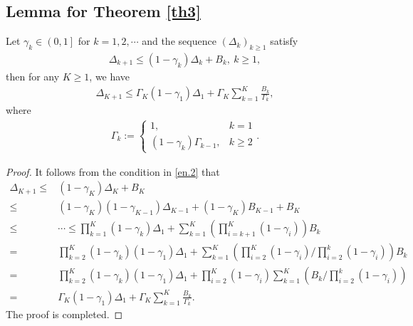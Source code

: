 \documentclass[twoside,11pt]{article}
\begin{document}
\subsection{Lemma for Theorem \ref{th3}}
\begin{lemma}\label{Lemre}
Let $\gamma_k\in\left( 0,1 \right]$ for $k=1,2,\cdots$ and the sequence $\left(  \Delta_k\right)_{k\ge 1}$ satisfy
\begin{equation}\label{en.2}
   	\begin{aligned}
   	\Delta_{k+1}\le (1-\gamma_k)\Delta_{k}+B_k,\ k\ge 1,
   	\end{aligned}
\end{equation}
then for any $K\ge 1$, we have 
\begin{equation}\label{Lemre.1}
   	\begin{aligned}
   	\Delta_{K+1}\le \Gamma_K(1-\gamma_1)\Delta_1+\Gamma_K\sum_{k=1}^{K}\frac{B_k}{\Gamma_k},
   	\end{aligned}
\end{equation}
where
\begin{equation}
   	\begin{aligned}
   	\Gamma_k:=
   	\begin{cases}
   	1,& \text{$k=1$}\\
   	(1-\gamma_k)\Gamma_{k-1},& \text{$k\ge2$}
   	\end{cases}.\nonumber
   	\end{aligned}
\end{equation}
\end{lemma}
\begin{proof}
It follows from the condition in \eqref{en.2} that
\begin{equation}
   	\begin{aligned}
   	\Delta_{K+1}
   	\le& (1-\gamma_K)\Delta_{K}+B_K
   	\\
   	\le&(1-\gamma_K)(1-\gamma_{K-1})\Delta_{K-1}+(1-\gamma_K){B_{K-1}}+{B_{K}}\\
   	\le&\cdots\le\prod_{k=1}^{K}(1-\gamma_k)\Delta_{1}+\sum_{k=1}^{K}\left( \prod_{i=k+1}^{K}(1-\gamma_i)\right) B_{k}
   	\\
   	{=}&\prod_{k=2}^{K}(1-\gamma_k)(1-\gamma_1)\Delta_{1}
   	+\sum_{k=1}^{K}\left( \prod_{i=2}^{K}(1-\gamma_i)\bigg/\prod_{i=2}^{k}(1-\gamma_i)\right) B_{k}\\
   	=&\prod_{k=2}^{K}(1-\gamma_k)(1-\gamma_1)\Delta_{1}
   	+\prod_{i=2}^{K}(1-\gamma_i)\sum_{k=1}^{K}
   	\left(B_{k}\bigg/\prod_{i=2}^{k}(1-\gamma_i)\right) \\
   	=&\Gamma_K (1-\gamma_{1})\Delta_{1}+\Gamma_K\sum_{k=1}^{K}\frac{B_k}{\Gamma_k}.\nonumber
   	\end{aligned}
\end{equation}
The proof is completed.
\end{proof}
\end{document}
